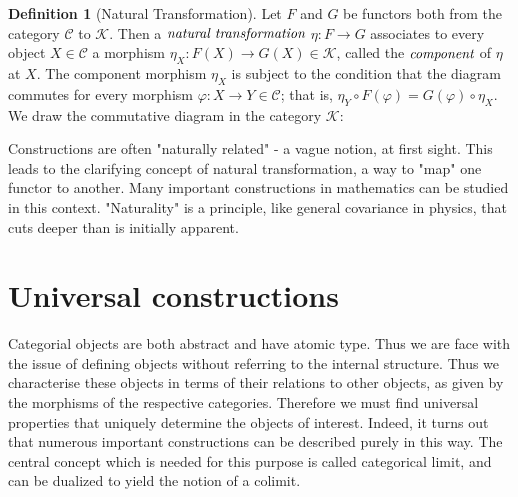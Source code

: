 \documentclass[10pt, oneside, reqno]{amsart}
\theoremstyle{plain}%
\theoremstyle{definition}
\newtheorem{defn}[thm]{Definition}
\theoremstyle{remark}
\begin{document}
\begin{defn}[Natural Transformation]
 Let $F$ and $G$ be functors both from the category $\mathcal{C}$ to $\mathcal{K}$.
 Then a $\emph{natural transformation}$ $\eta : F \to G$ associates to every object
 $X \in \mathcal{C}$ a morphism $\eta_{X} : F(X) \to G(X) \in \mathcal{K}$, called the $\emph{component}$
 of $\eta$ at $X$. The component morphism $\eta_{X}$ is subject to the condition that the diagram
 commutes for every morphism $\varphi: X \to Y \in \mathcal{C}$; that is,
 $\eta_{Y} \circ F(\varphi) = G(\varphi) \circ \eta_{X}$.
 \\
 We draw the commutative diagram in the category $\mathcal{K}$:
\end{defn}
Constructions are often "naturally related" - a vague notion, at first sight.
This leads to the clarifying concept of natural transformation, a way to "map" one functor to another.
Many important constructions in mathematics can be studied in this context.
"Naturality" is a principle, like general covariance in physics, that cuts deeper than is initially apparent.


\section{Universal constructions} %
\label{sec:universalconstructions}
Categorial objects are both abstract and have atomic type.
Thus we are face with the issue of defining objects without referring to the internal structure.
Thus we characterise these objects in terms of their relations to other objects, as given by the morphisms 
of the respective categories. Therefore we must find universal properties that uniquely determine the objects of interest.
Indeed, it turns out that numerous important constructions can be described purely in this way.
The central concept which is needed for this purpose is called categorical limit, and can be dualized to yield the notion of a colimit.
\end{document}
